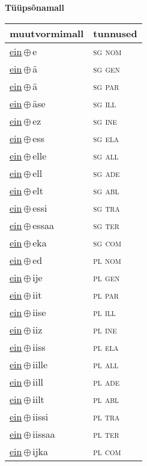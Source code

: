 

\vspace{3.5em}
\noindent \begin{minipage}{\textwidth}
\noindent \textbf{Tüüpsõnamall \,}\\

\begin{sideways}
\begin{tabular}{l l}
muutvormimall & tunnused \\
\hline
\underline{ein}\,$\oplus$\,e & \textsc{ sg nom } \\
\underline{ein}\,$\oplus$\,ä & \textsc{ sg gen } \\
\underline{ein}\,$\oplus$\,ä & \textsc{ sg par } \\
\underline{ein}\,$\oplus$\,äse & \textsc{ sg ill } \\
\underline{ein}\,$\oplus$\,ez & \textsc{ sg ine } \\
\underline{ein}\,$\oplus$\,ess & \textsc{ sg ela } \\
\underline{ein}\,$\oplus$\,elle & \textsc{ sg all } \\
\underline{ein}\,$\oplus$\,ell & \textsc{ sg ade } \\
\underline{ein}\,$\oplus$\,elt & \textsc{ sg abl } \\
\underline{ein}\,$\oplus$\,essi & \textsc{ sg tra } \\
\underline{ein}\,$\oplus$\,essaa & \textsc{ sg ter } \\
\underline{ein}\,$\oplus$\,eka & \textsc{ sg com } \\
\underline{ein}\,$\oplus$\,ed & \textsc{ pl nom } \\
\underline{ein}\,$\oplus$\,ije & \textsc{ pl gen } \\
\underline{ein}\,$\oplus$\,iit & \textsc{ pl par } \\
\underline{ein}\,$\oplus$\,iise & \textsc{ pl ill } \\
\underline{ein}\,$\oplus$\,iiz & \textsc{ pl ine } \\
\underline{ein}\,$\oplus$\,iiss & \textsc{ pl ela } \\
\underline{ein}\,$\oplus$\,iille & \textsc{ pl all } \\
\underline{ein}\,$\oplus$\,iill & \textsc{ pl ade } \\
\underline{ein}\,$\oplus$\,iilt & \textsc{ pl abl } \\
\underline{ein}\,$\oplus$\,iissi & \textsc{ pl tra } \\
\underline{ein}\,$\oplus$\,iissaa & \textsc{ pl ter } \\
\underline{ein}\,$\oplus$\,ijka & \textsc{ pl com } \\
\end{tabular}
\end{sideways}
\label{tab:tüüpsõnamall-eine}

\end{minipage}

